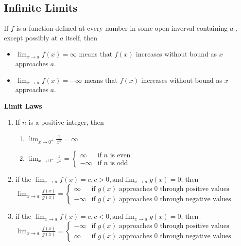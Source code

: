 \documentclass[11pt]{article}
\begin{document}
\subsection{Infinite Limits}
If $f$ is a function defined at every number in some open inverval containing $a$
, except possibly at $a$ itself, then
\begin{itemize}
    \item $\displaystyle\lim_{x \to a} f(x) = \infty$ 
        means that $f(x)$ increases without bound as $x$
        approaches $a$.
    \item $\displaystyle\lim_{x \to a} f(x) = -\infty$ 
        means that $f(x)$ increases without bound as $x$
        approaches $a$.
    
\end{itemize}
\textbf{Limit Laws}
\begin{enumerate}
    \item If $n$ is a positive integer, then
        \begin{enumerate}
            \item $
                \displaystyle 
                \lim_{x\to0^+}\frac{1}{x^n} = \infty
            $
            \item $
                \displaystyle 
                \lim_{x\to0^-}\frac{1}{x^n} =
                \begin{cases}
                    \infty &\text{if }n\text{ is even}\\
                    -\infty &\text{if }n\text{ is odd}
                \end{cases}
            $
        \end{enumerate}
    \item if the $
           \displaystyle
            \lim_{x\to a} f(x) =c, c>0, \text{and} \lim_{x\to a} g(x) =0
            \text{, then}
        $\\
        $
            \displaystyle\lim_{x\to a}\frac{f(x)}{g(x)}=
            \begin{cases}
                \infty &\text{if }g(x)\text{ approaches 0 through positive values}\\
                -\infty &\text{if }g(x)\text{ approaches 0 through negative values}
            \end{cases}
        $
    \item if the $
            \displaystyle
            \lim_{x\to a} f(x) =c, c<0, \text{and} \lim_{x\to a} g(x) =0
            \text{, then}
        $\\
        $
            \displaystyle\lim_{x\to a}\frac{f(x)}{g(x)}=
            \begin{cases}
                -\infty &\text{if }g(x)\text{ approaches 0 through positive values}\\
                \infty &\text{if }g(x)\text{ approaches 0 through negative values}
            \end{cases}
        $
\end{enumerate}
\end{document}
